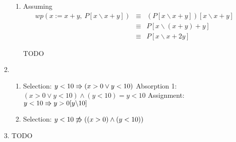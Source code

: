 \documentclass{article}
\begin{document}
\begin{enumerate}
\begin{enumerate}
    \item Assuming
        \begin{eqnarray*}
            wp(x := x + y,\ P[x \backslash x + y]) & \equiv & (P[x \backslash x + y])[x \backslash x + y]\\
                & \equiv & P[x \backslash (x + y) + y]\\
                & \equiv & P[x \backslash x + 2y]
        \end{eqnarray*}

        TODO

    \end{enumerate}
\item
    \begin{enumerate}
    \item 
        \DERIVE
         {Selection: $y < 10 \Rrightarrow (x > 0 \lor y < 10)$}
         {Absorption 1: $(x > 0 \lor y < 10) \land (y < 10) = y < 10$}
         {Assignment: $y < 10 \Rrightarrow y > 0[y \backslash 10]$}
        \ENDDERIVE

    \item 
        \DERIVE
        \hint{\doesntrefsto} {Selection: $y < 10 \not\Rrightarrow ((x > 0) \land (y < 10))$}

        \ENDDERIVE
    \end{enumerate}
\item TODO
\end{enumerate}






\end{document}
